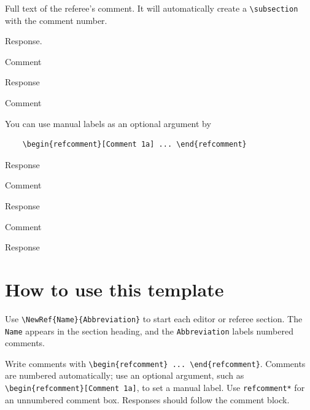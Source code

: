 \documentclass[12pt]{article}
\begin{document}
\vspace*{\bigskipamount}

\begin{refcomment}
  Full text of the referee's comment. It will automatically create a \texttt{\textbackslash subsection} with the comment number.
  
  \lipsum[1-2]
\end{refcomment}

Response.
\lipsum[3-4]

\begin{refcomment}
  Comment 
\end{refcomment}

Response

\begin{refcomment*}
  Comment 
\end{refcomment*}

\vspace*{\bigskipamount}

\begin{refcomment}[Comment 1a]
  You can use manual labels as an optional argument by 
  \begin{verbatim}
    \begin{refcomment}[Comment 1a] ... \end{refcomment}
  \end{verbatim}
\end{refcomment}
Response

\begin{refcomment}[Comment 1b]
  Comment 
\end{refcomment}
Response

\begin{refcomment}
  Comment 
\end{refcomment}
Response


\newpage
\section*{How to use this template}

Use \texttt{\textbackslash NewRef\{Name\}\{Abbreviation\}} to start each editor or referee section. The \texttt{Name} appears in the section heading, and the \texttt{Abbreviation} labels numbered comments.

Write comments with \texttt{\textbackslash begin\{refcomment\} ... \textbackslash end\{refcomment\}}. Comments are numbered automatically; use an optional argument, such as \texttt{\textbackslash begin\{refcomment\}[Comment 1a]}, to set a manual label. Use \texttt{refcomment*} for an unnumbered comment box. Responses should follow the comment block.
\end{document}
